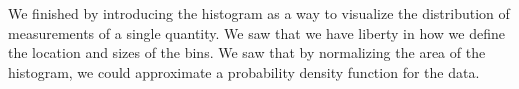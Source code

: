 \begin{chapterSummary}
We finished by introducing the histogram as a way to visualize the distribution of measurements of a single quantity. We saw that we have liberty in how we define the location and sizes of the bins. We saw that by normalizing the area of the histogram, we could approximate a probability density function for the data.
\end{chapterSummary}